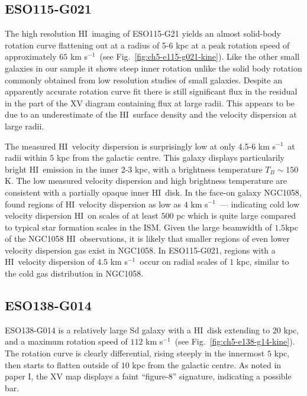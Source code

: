 \documentclass[traditabstract]{aa} %
\newcommand\HI{H{\small I}}
\newcommand\kms{km s$^{-1}$}
\begin{document}
\subsection{ESO115-G021}

The high resolution \HI\ imaging of ESO115-G21 yields an almost solid-body
rotation curve flattening out at a radius of 5-6 kpc at
a peak rotation speed of approximately $65$ \kms\ (see
Fig.~\ref{fig:ch5-e115-g021-kine}).  Like the other small galaxies
in our sample it shows steep inner rotation unlike the solid
body rotation commonly obtained from low resolution studies of small
galaxies.  Despite an apparently accurate
rotation curve fit there is still significant flux in the residual in
the part of the XV diagram containing flux at large radii. This appears to be
due to an underestimate of the \HI\ surface density and the velocity
dispersion at large radii.

The measured \HI\ velocity dispersion is surprisingly low at only
4.5-6 \kms\ at radii within $5$ kpc from the galactic centre. This
galaxy displays particularily bright \HI\ emission in the inner 2-3
kpc, with a brightness temperature $T_B \sim 150$ K. The low measured 
velocity dispersion and high brightness temperature are consistent with a partially
opaque inner \HI\ disk. In the face-on galaxy NGC1058,
\citet{pr2006} found regions of \HI\ velocity dispersion as low as
$4$ \kms\ --- indicating cold low velocity dispersion \HI\ on
scales of at least $500$ pc which is quite large compared to typical star
formation scales in the ISM. Given the 
large beamwidth of $1.5$kpc of the NGC1058 \HI\ observations, it is likely 
that smaller regions of even lower velocity dispersion gas exist in 
NGC1058. In ESO115-G021, regions with a \HI\ velocity
dispersion of $4.5$ \kms\ occur on radial scales of $1$ kpc, similar to the cold gas 
distribution in NGC1058.


\subsection{ESO138-G014}

ESO138-G014 is a relatively large Sd galaxy with a \HI\ disk extending
to $20$ kpc, and a maximum rotation speed of $112$ \kms\ (see
Fig.~\ref{fig:ch5-e138-g14-kine}). The rotation curve is clearly
differential, rising steeply in the innermost $5$ kpc, then starts to flatten 
outside of $10$ kpc from the
galactic centre. As noted in paper I, the XV map
displays a faint ``figure-8'' signature, indicating a possible bar. 
\end{document}
